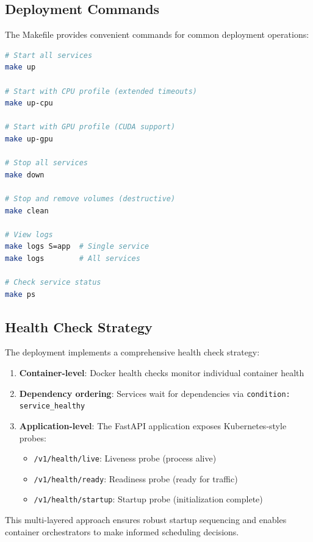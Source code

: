 \subsection{Deployment Commands}

The Makefile provides convenient commands for common deployment operations:

\begin{lstlisting}[language=bash, caption=Makefile deployment targets]
# Start all services
make up

# Start with CPU profile (extended timeouts)
make up-cpu

# Start with GPU profile (CUDA support)
make up-gpu

# Stop all services
make down

# Stop and remove volumes (destructive)
make clean

# View logs
make logs S=app  # Single service
make logs        # All services

# Check service status
make ps
\end{lstlisting}

\subsection{Health Check Strategy}

The deployment implements a comprehensive health check strategy:

\begin{enumerate}
    \item \textbf{Container-level}: Docker health checks monitor individual container health
    \item \textbf{Dependency ordering}: Services wait for dependencies via \texttt{condition: service\_healthy}
    \item \textbf{Application-level}: The FastAPI application exposes Kubernetes-style probes:
    \begin{itemize}
        \item \texttt{/v1/health/live}: Liveness probe (process alive)
        \item \texttt{/v1/health/ready}: Readiness probe (ready for traffic)
        \item \texttt{/v1/health/startup}: Startup probe (initialization complete)
    \end{itemize}
\end{enumerate}

This multi-layered approach ensures robust startup sequencing and enables container orchestrators to make informed scheduling decisions.

